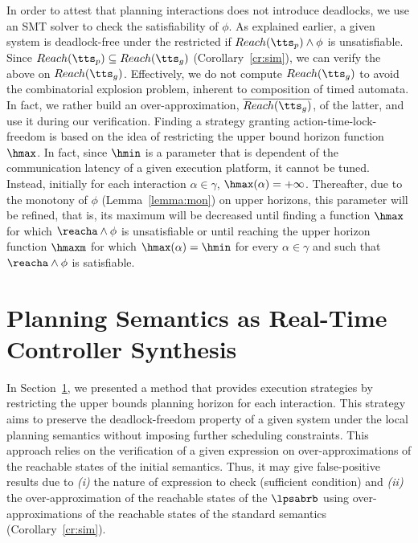 In order to attest that planning interactions does not introduce deadlocks,
we use an SMT solver to check the satisfiability of $\phi$.
As explained earlier, a given system is deadlock-free under
the restricted \lpsabrb if $Reach(\tts_p)\wedge\phi$ is unsatisfiable. Since
$Reach(\tts_p)\subseteq Reach(\tts_g)$ (Corollary~\ref{cr:sim}), we can verify the above on 
$Reach(\tts_g)$.
Effectively, we do not compute $Reach(\tts_g)$ to avoid the combinatorial explosion problem,
inherent to composition of timed automata. In fact, we rather build an over-approximation,
$\overline{Reach(\tts_g)}$, of the latter, and use it during our verification.
Finding a strategy granting action-time-lock-freedom is based on the idea of restricting
the upper bound horizon function $\hmax$. In fact, since $\hmin$ is a parameter that is 
dependent of the communication latency of a given execution platform, it cannot be tuned.
Instead, initially for each interaction $\alpha\in\gamma$, $\hmax(\alpha)=+\infty$. Thereafter,
due to the monotony of $\phi$ (Lemma~\ref{lemma:mon}) on upper horizons, this parameter will be 
refined, that is, its maximum will be decreased until finding a function $\hmax$ for which
$\reacha\wedge\phi$ is unsatisfiable or until reaching the upper horizon function
$\hmaxm$ for which $\hmax(\alpha)=\hmin$ for every $\alpha\in\gamma$ and such that
$\reacha\wedge\phi$ is satisfiable. 


\section{Planning Semantics as Real-Time Controller Synthesis}
\label{sec5}

In Section~\ref{sec5}, we presented a method that provides execution strategies
by restricting the upper bounds planning horizon for each interaction. This strategy aims
to preserve the deadlock-freedom property of a given system under the local planning semantics 
without imposing further scheduling constraints.
This approach relies on the verification of a given expression on over-approximations of the
reachable states of the initial semantics. Thus, it may give false-positive results due to
\emph{(i)} the nature of expression to check (sufficient condition) and \emph{(ii)} the
over-approximation of the reachable states of the $\lpsabrb$ using over-approximations of 
the reachable states of the standard semantics (Corollary~\ref{cr:sim}). 

